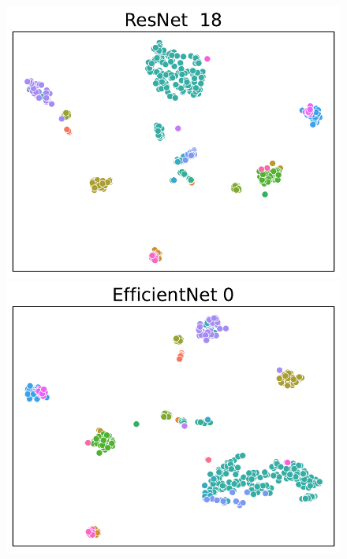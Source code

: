 \begin{figure}[htbp]
    \centering
    \begin{minipage}{0.4\linewidth}
        \centering
        \includegraphics[width=\linewidth]{images/ResNet.csv_18_0.pdf}
    \end{minipage}
    \begin{minipage}{0.4\linewidth}
        \centering
        \includegraphics[width=\linewidth]{images/EfficientNet.csv_0_0.pdf}
    \end{minipage}

\end{figure}
